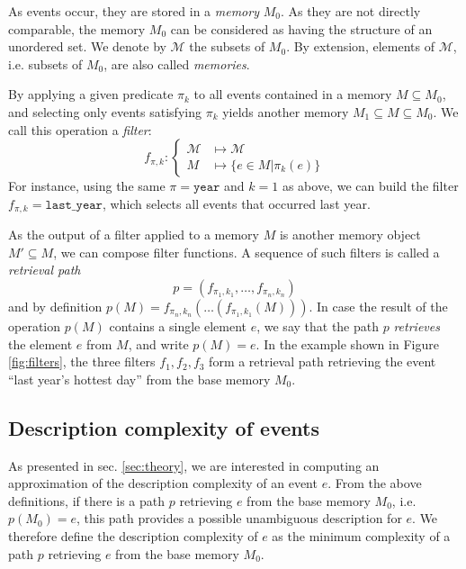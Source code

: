 \documentclass[conference]{IEEEtran}
\begin{document}
As events occur, they are stored in a \emph{memory} $M_0$. As they are not directly comparable, the memory $M_0$ can be considered as having the structure of an unordered set. We denote by $\mathcal{M}$ the subsets of $M_0$. By extension, elements of $\mathcal{M}$, i.e. subsets of $M_0$, are also called \emph{memories}.

By applying a given predicate $\pi_k$ to all events contained in a memory $M \subseteq M_0$, and selecting only events satisfying $\pi_k$ yields another memory $M_1 \subseteq M \subseteq M_0$. We call this operation a \emph{filter}:
\begin{equation}
  \label{eq:filter}
  f_{\pi, k}: \begin{cases}
    \mathcal{M} & \mapsto \mathcal{M}             \\
    M           & \mapsto \{e \in M | \pi_k(e) \}
  \end{cases}
\end{equation}
For instance, using the same $\pi = \mathtt{year}$ and $k=1$ as above, we can
build the filter $f_{\pi, k} = \mathtt{last\_{}year}$, which selects all events
that occurred last year.

As the output of a filter applied to a memory $M$ is another memory
object $M' \subseteq M$, we can compose filter
functions. A sequence of such filters is called a \emph{retrieval path}
\begin{equation}
  \label{eq:ret_def}
  p = (f_{\pi_{1}, k_{1}}, \dots, f_{\pi_{n}, k_{n}})
\end{equation}
and by definition
$p(M) = f_{\pi_{n}, k_{n}}(\dots(f_{\pi_{1}, k_{1}}(M)))$.
In case the result of the operation $p(M)$ contains a single element
$e$, we say that the path $p$ \emph{retrieves} the element $e$ from $M$, and write
$p(M) = e$. In the example shown in Figure \ref{fig:filters}, the three filters $f_1, f_2, f_3$ form a retrieval path retrieving the event ``last year's hottest day'' from the base memory $M_0$.

\subsection{Description complexity of events}

As presented in sec. \ref{sec:theory}, we are interested in computing an approximation of the description complexity of an event $e$. From the above definitions, if there is a path $p$ retrieving $e$ from the base memory $M_0$, i.e. $p(M_0) = e$, this path provides a possible unambiguous description for $e$. We therefore define the description complexity of $e$ as the minimum complexity of a path $p$ retrieving $e$ from the base memory $M_0$.
\end{document}
